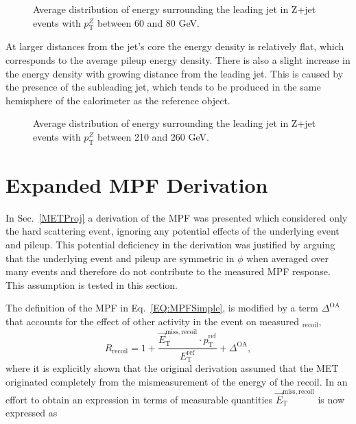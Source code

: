 \begin{figure}[!ht]
 \begin{center}
 \end{center}
 \caption[Recoil energy distribution in Z+jet, 60-80 GeV]
 {\small Average distribution of energy surrounding the leading jet in Z+jet events with $p_{\mathrm T}^{Z}$ between 60 and 80 GeV. }
 \label{Fig:EMShape60-80}
\end{figure}

At larger distances from the jet's core the energy density is relatively flat, which corresponds to the average pileup energy density.  
There is also a slight increase in the energy density with growing distance from the leading jet.  
This is caused by the presence of the subleading jet, which tends to be produced in the same hemisphere of the calorimeter as the reference object.  


\begin{figure}[!ht]
 \begin{center}
 \end{center}
 \caption[Recoil energy distribution in Z+jet, 210-260 GeV]
 {\small Average distribution of energy surrounding the leading jet in Z+jet events with $p_{\mathrm T}^{Z}$ between 210 and 260 GeV. }
 \label{Fig:EMShape210-260}
\end{figure}

\section{Expanded MPF Derivation}

In Sec.~\ref{METProj} a derivation of the MPF was presented which considered only the hard scattering event, ignoring any potential effects of the underlying event and pileup.  
This potential deficiency in the derivation was justified by arguing that the underlying event and pileup are symmetric in $\phi$ when averaged over many events and therefore do not contribute to the measured MPF response.  
This assumption is tested in this section.  

The definition of the MPF in Eq.~\ref{EQ:MPFSimple}, is modified by a term $\Delta^{\mathrm{OA}}$ that accounts for the effect of other activity in the event on measured $_{\mathrm{recoil}}$, 
\begin{equation}
  \label{Eq:MPFWithDelta}
  R_{\mathrm{recoil}}=1+\frac{\vec{E}_{\mathrm T}^{\mathrm{miss, recoil}}\cdot\hat{p}_{\mathrm T}^{\mathrm{ref}}}{E_{\mathrm T}^{\mathrm{ref}}} + \Delta^{\mathrm{OA}}, 
\end{equation}
\noindent
where it is explicitly shown that the original derivation assumed that the MET originated completely from the mismeasurement of the energy of the recoil.  
In an effort to obtain an expression in terms of measurable quantities $\vec{E}_{\mathrm T}^{\mathrm{miss, recoil}}$ is now expressed as 

